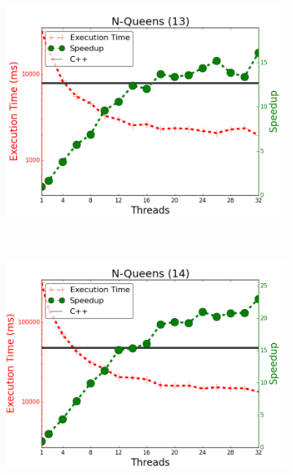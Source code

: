 \begin{figure}[]
        \centering
        \begin{subfigure}[b]{\plotsize\textwidth}
                \includegraphics[width=\textwidth]{experiments/scalability/scale-8queens-13.png}
                \label{fig:implementation:scale_queens13}
        \end{subfigure}
        ~
        \begin{subfigure}[b]{\plotsize\textwidth}
                \includegraphics[width=\textwidth]{experiments/scalability/scale-8queens-14.png}
                \label{fig:implementation:scale_queens14}
        \end{subfigure}


        \label{fig:implementation:scale_queens}
\end{figure}

